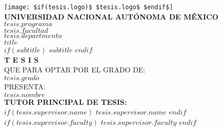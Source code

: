 

\pagestyle{plain} %


\begin{titlepage}
    \begin{center}
        \vspace*{-1.5cm} %
        
        \texttt{[image: \$if(tesis.logo)\$ \$tesis.logo\$ \$endif\$]}\\[0.5cm]
        
        {\large \textbf{UNIVERSIDAD NACIONAL AUTÓNOMA DE MÉXICO}}\\[0.4cm]
        
        {\large \textbf{\MakeUppercase{$tesis.programa$}}}\\[0.3cm]
        
        {\large \MakeUppercase{$tesis.facultad$}}\\[0.2cm]
        {\large \MakeUppercase{$tesis.departmento$}}\\[1cm]
        
        {\Large \textbf{$title$}}\\[1cm]
        {\small $if(subtitle)$ $subtitle$ $endif$}\\[1cm]
        
        {\LARGE \textbf{T E S I S}}\\[0.5cm]
        
        {\large QUE PARA OPTAR POR EL GRADO DE:}\\[0.3cm]
        {\Large \textbf{$tesis.grado$}}\\[1cm]
        
        {\large PRESENTA:}\\[0.3cm]
        {\LARGE \textbf{$tesis.nombre$}}\\[1.0cm]
        
        {\small \textbf{TUTOR PRINCIPAL DE TESIS:}}\\
        {\small $if(tesis.supervisor.name)$ $tesis.supervisor.name$ $endif$}\\
        {\small $if(tesis.supervisor.faculty)$ $tesis.supervisor.faculty$ $endif$}\\[0.5cm]
        

\end{center}
\end{titlepage}
